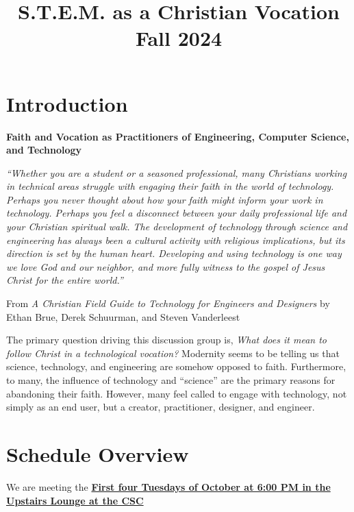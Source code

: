 \documentclass[12pt]{article}
\date{}
\title{S.T.E.M. as a Christian Vocation\\\medskip
\large Fall 2024}
\let\oldsection\section
\renewcommand\section{\clearpage\oldsection}
\begin{document}
\maketitle

\section*{Introduction}
\label{sec:orgf3b89ac}
\begin{center}
\textbf{Faith and Vocation as Practitioners of Engineering, Computer Science, and
 Technology}
\end{center}

\emph{``Whether you are a student or a seasoned professional, many Christians working
in technical areas struggle with engaging their faith in the world of
technology. Perhaps you never thought about how your faith might inform your
work in technology. Perhaps you feel a disconnect between your daily
professional life and your Christian spiritual walk. The development of
technology through science and engineering has always been a cultural activity
with religious implications, but its direction is set by the human heart.
Developing and using technology is one way we love God and our neighbor, and
more fully witness to the gospel of Jesus Christ for the entire world.''}

\begin{flushright}
From \emph{A Christian Field Guide to Technology for Engineers and Designers} by
Ethan Brue, Derek Schuurman, and Steven Vanderleest
\end{flushright}

The primary question driving this discussion group is, \emph{What does it mean to
follow Christ in a technological vocation?} Modernity seems to be telling us that
science, technology, and engineering are somehow opposed to faith. Furthermore,
to many, the influence of technology and ``science'' are the primary reasons for
abandoning their faith. However, many feel called to engage with technology, not
simply as an end user, but a creator, practitioner, designer, and engineer.
\section*{Schedule Overview}
\label{sec:org557e248}
We are meeting the \textbf{\uline{First four Tuesdays of October at 6:00 PM in the Upstairs
Lounge at the CSC}}
\end{document}
